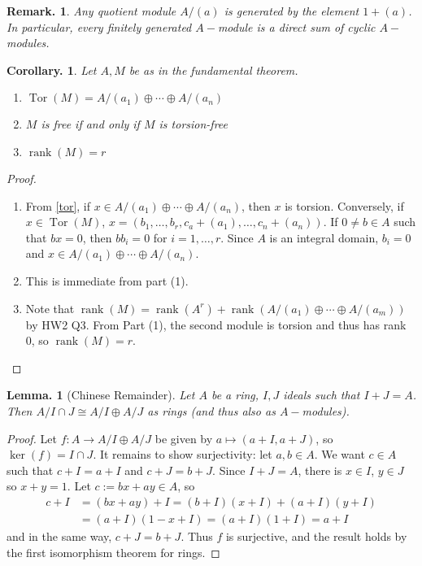 \documentclass[11pt, a4paper]{memoir}
\theoremstyle{change}
\newtheorem{lemma}[theorem]{Lemma.}
\newtheorem{corollary}[theorem]{Corollary.}
\theoremstyle{plain}
\theoremstyle{nonumberplain}
\newtheorem{remark}{Remark.}
\newtheorem{proof}{Proof}
\DeclareMathOperator{\rank}{rank}
\DeclareMathOperator{\Tor}{Tor}
\numberwithin{equation}{section}
\begin{document}
\begin{remark}
    Any quotient module $A/(a)$ is generated by the element $1+(a)$.
    In particular, every finitely generated $A-$module is a direct sum of cyclic $A-$modules.
\end{remark}
\begin{corollary}
    Let $A,M$ be as in the fundamental theorem.
    \begin{enumerate}[nolistsep]
        \item $\Tor(M)=A/(a_1)\oplus\cdots\oplus A/(a_n)$
        \item $M$ is free if and only if $M$ is torsion-free
        \item $\rank(M)=r$
    \end{enumerate}
\end{corollary}
\begin{proof}
    \begin{enumerate}[nolistsep]
        \item From \cref{tor}, if $x\in A/(a_1)\oplus\cdots\oplus A/(a_n)$, then $x$ is torsion.
            Conversely, if $x\in\Tor(M)$, $x=(b_1,\ldots,b_r,c_a+(a_1),\ldots,c_n+(a_n))$.
            If $0\neq b\in A$ such that $bx=0$, then $bb_i=0$ for $i=1,\ldots,r$.
            Since $A$ is an integral domain, $b_i=0$ and $x\in A/(a_1)\oplus\cdots\oplus A/(a_n)$.
        \item This is immediate from part (1).
        \item Note that $\rank(M)=\rank(A^r)+\rank(A/(a_1)\oplus \cdots\oplus A/(a_m))$ by HW2 Q3.
            From Part (1), the second module is torsion and thus has rank 0, so $\rank(M)=r$.
    \end{enumerate}
\end{proof}
\begin{lemma}[Chinese Remainder]
    Let $A$ be a ring, $I,J$ ideals such that $I+J=A$.
    Then $A/I\cap J\cong A/I\oplus A/J$ as rings (and thus also as $A-$modules).
\end{lemma}
\begin{proof}
    Let $f:A\to A/I\oplus A/J$ be given by $a\mapsto(a+I,a+J)$, so $\ker(f)=I\cap J$.
    It remains to show surjectivity: let $a,b\in A$.
    We want $c\in A$ such that $c+I=a+I$ and $c+J=b+J$.
    Since $I+J=A$, there is $x\in I$, $y\in J$ so $x+y=1$.
    Let $c:=bx+ay\in A$, so
    \begin{align*}
        c+I &= (bx+ay)+I =(b+I)(x+I)+(a+I)(y+I)\\
            &= (a+I)(1-x+I)= (a+I)(1+I)= a+I
    \end{align*}
    and in the same way, $c+J=b+J$.
    Thus $f$ is surjective, and the result holds by the first isomorphism theorem for rings.
\end{proof}
\end{document}
